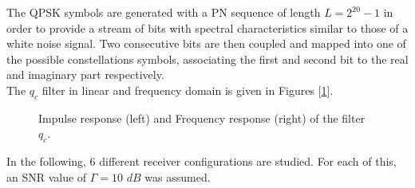 \documentclass[a4paper, 12pt]{report}
\begin{document}
The QPSK symbols are generated with a PN sequence of length $L=2^{20}-1$ in order to provide a stream of bits with spectral characteristics similar to those of a white noise signal. Two consecutive bits are then coupled and mapped into one of the possible constellations symbols, associating the first and second bit to the real and imaginary part respectively. \\
The $q_c$ filter in linear and frequency domain is given in Figures [\ref{qc}].

\begin{figure}[H]
	\centering
	\caption{Impulse response (left) and Frequency response (right) of the filter $q_c$.}\label{qc}
\end{figure}

In the following, 6 different receiver configurations are studied. For each of this, an SNR value of $\Gamma = 10$ $dB$ was assumed.

\clearpage
\end{document}
